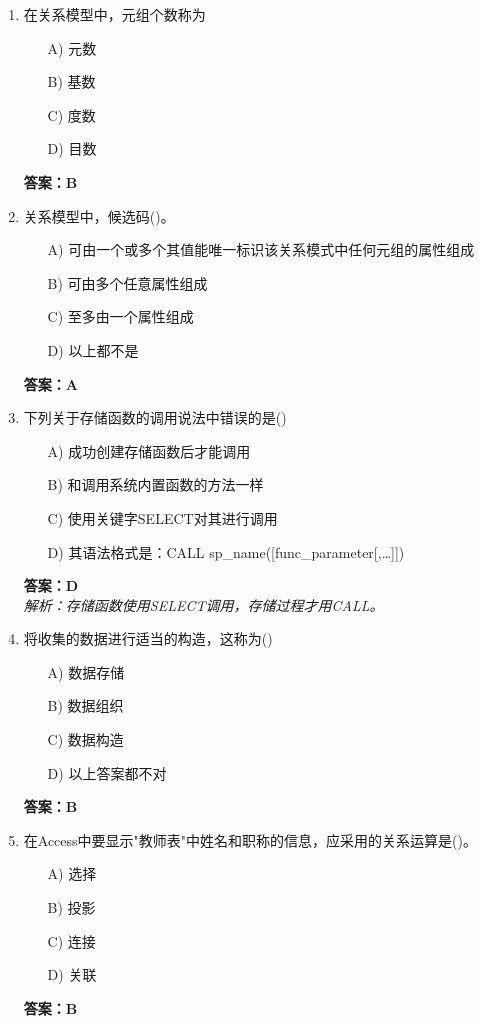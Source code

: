 \documentclass[a4paper,12pt]{article}
\begin{document}
\begin{enumerate}[label=\arabic*.]
\item 在关系模型中，元组个数称为
\begin{itemize}
    \item[A)] 元数
    \item[B)] 基数
    \item[C)] 度数
    \item[D)] 目数
\end{itemize}
\textbf{答案：B}

\item 关系模型中，候选码()。
\begin{itemize}
    \item[A)] 可由一个或多个其值能唯一标识该关系模式中任何元组的属性组成
    \item[B)] 可由多个任意属性组成
    \item[C)] 至多由一个属性组成
    \item[D)] 以上都不是
\end{itemize}
\textbf{答案：A}

\item 下列关于存储函数的调用说法中错误的是()
\begin{itemize}
    \item[A)] 成功创建存储函数后才能调用
    \item[B)] 和调用系统内置函数的方法一样
    \item[C)] 使用关键字SELECT对其进行调用
    \item[D)] 其语法格式是：CALL sp\_name([func\_parameter[,\dots]])
\end{itemize}
\textbf{答案：D} \\
\textit{解析：存储函数使用SELECT调用，存储过程才用CALL。}

\item 将收集的数据进行适当的构造，这称为()
\begin{itemize}
    \item[A)] 数据存储
    \item[B)] 数据组织
    \item[C)] 数据构造
    \item[D)] 以上答案都不对
\end{itemize}
\textbf{答案：B}

\item 在Access中要显示"教师表"中姓名和职称的信息，应采用的关系运算是()。
\begin{itemize}
    \item[A)] 选择
    \item[B)] 投影
    \item[C)] 连接
    \item[D)] 关联
\end{itemize}
\textbf{答案：B}


\end{enumerate}
\end{document}
